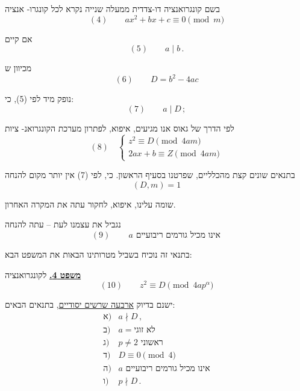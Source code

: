 \noindent בשם קונגרואנציה דו-צדדית ממעלה שנייה נקרא לכל קונגרו-
אנציה
\[ (4) \qquad ax^2 + bx + c \equiv 0 \pmod{m} \]

\noindent אם קיים
\[ (5) \qquad a \mid b \, . \]

\noindent מכיוון ש
\[ (6) \qquad D = b^2 - 4ac \]

\noindent נופק מיד לפי (5), כי:
\[ (7) \qquad a \mid D \, ; \]

\noindent לפי הדרך של גאוס אנו מגיעים, איפוא, לפתרון מערכת הקונגרואנ-
ציות
\[ (8) \quad \left\{ \begin{array}{l}
z^2 \equiv D \pmod{4am} \\
2ax + b \equiv Z \pmod{4am}
\end{array} \right. \]

\noindent בתנאים שונים קצת מהכלליים, שפרטנו בסעיף הראשון. כי, לפי (7)
אין יותר מקום להנחה
\[ (D, m) = 1 \]

\noindent שומה עלינו, איפוא, לחקור עתה את המקרה האחרון.

\noindent נגביל את עצמנו לעת -- עתה להנחה
\[ (9) \qquad \boxed{\, a \text{ אינו מכיל גורמים ריבועיים} \,} \]

\noindent בתנאי זה נוכיח בשביל מטרותינו הבאות את המשפט הבא:

\bigskip
\noindent\textbf{\underline{משפט 4.}} לקונגרואנציה
\[ (10) \qquad z^2 \equiv D \pmod{4ap^{\alpha}} \]

\noindent ישנם בדיוק \underline{ארבעה שרשים יסודיים}, בתנאים הבאים:
\[ \begin{array}{ll}
\text{א)} & a \nmid D \, , \\
\text{ב)} & a = \text{לא זוגי} \\
\text{ג)} & p \neq 2 \text{ ראשוני} \\
\text{ד)} & D \equiv 0 \pmod{4} \\
\text{ה)} & a \text{ אינו מכיל גורמים ריבועיים} \\
\text{ו)} & p \nmid D \, .
\end{array} \]

